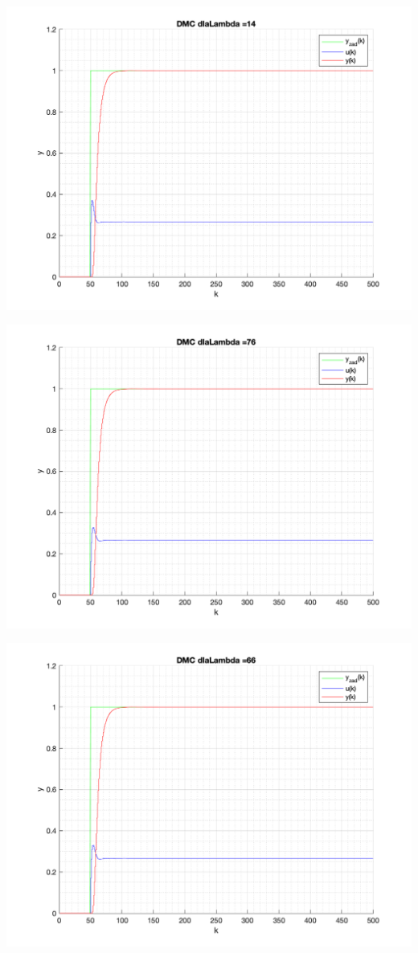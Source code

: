\documentclass[a4paper, 11pt]{article}
\begin{document}
\begin{enumerate}
 \includegraphics[width=\linewidth]{./ModelsP4_Lambda/P4_DMC_Lambda_14_png.png} 
 
 \includegraphics[width=\linewidth]{./ModelsP4_Lambda/P4_DMC_Lambda_76_png.png} 
 
 \includegraphics[width=\linewidth]{./ModelsP4_Lambda/P4_DMC_Lambda_66_png.png} 
 

\end{enumerate}
\end{document}
